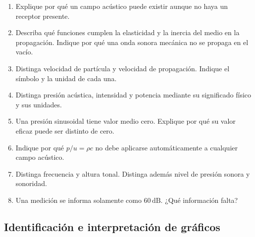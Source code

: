 \begin{enumerate}[label=\textbf{C\arabic*.},leftmargin=*]
    \item Explique por qué un campo acústico puede existir aunque no haya un
    receptor presente.

    \item Describa qué funciones cumplen la elasticidad y la inercia del medio
    en la propagación. Indique por qué una onda sonora mecánica no se propaga
    en el vacío.

    \item Distinga velocidad de partícula y velocidad de propagación. Indique
    el símbolo y la unidad de cada una.

    \item Distinga presión acústica, intensidad y potencia mediante su
    significado físico y sus unidades.

    \item Una presión sinusoidal tiene valor medio cero. Explique por qué su
    valor eficaz puede ser distinto de cero.

    \item Indique por qué \(p/u=\rho c\) no debe aplicarse automáticamente a
    cualquier campo acústico.

    \item Distinga frecuencia y altura tonal. Distinga además nivel de presión
    sonora y sonoridad.

    \item Una medición se informa solamente como \(60\,\text{dB}\).
    ¿Qué información falta?
\end{enumerate}

\subsection*{Identificación e interpretación de gráficos}

